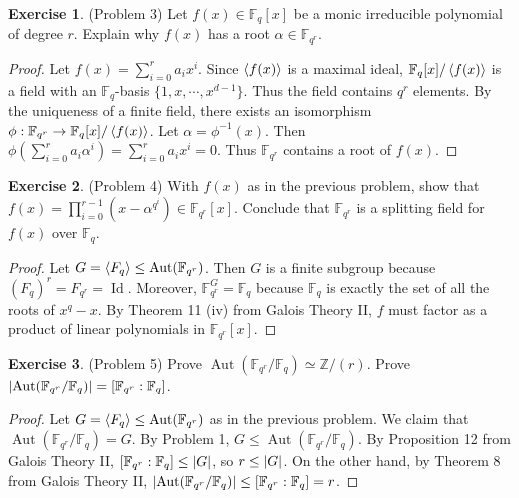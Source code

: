 \documentclass[12pt, psamsfonts]{amsart}
\theoremstyle{definition}
\newtheorem*{exer}{Exercise}
\theoremstyle{remark}
\DeclareMathOperator{\Id}{Id}
\DeclareMathOperator{\Aut}{Aut}
\numberwithin{equation}{section}
\begin{document}
\begin{exer}{(Problem 3)}
  Let $f(x) \in \mathbb{F}_q[x]$ be a monic irreducible polynomial of degree $r$.
  Explain why $f(x)$ has a root $\alpha \in \mathbb{F}_{q^r}$.
\end{exer}

\begin{proof}
  Let $f(x) = \sum_{i=0}^{r} a_ix^i$.
  Since $\ev{f(x)}$ is a maximal ideal, $\mathbb{F}_q[x]/\ev{f(x)}$ is a field with an $\mathbb{F}_q$-basis $\{ 1, x, \cdots, x^{d - 1} \}$.
  Thus the field contains $q^r$ elements.
  By the uniqueness of a finite field, there exists an isomorphism $\phi: \mathbb{F}_{q^r} \rightarrow \mathbb{F}_q[x]/\ev{f(x)}$.
  Let $\alpha = \phi^{-1}(x)$.
  Then $\phi(\sum_{i=0}^{r} a_i\alpha^i) = \sum_{i=0}^{r}a_ix^i = 0$.
  Thus $\mathbb{F}_{q^r}$ contains a root of $f(x)$.
\end{proof}

\begin{exer}{(Problem 4)}
  With $f(x)$ as in the previous problem, show that $f(x) = \prod_{i=0}^{r-1} (x - \alpha^{q^i}) \in \mathbb{F}_{q^r}[x]$.
  Conclude that $\mathbb{F}_{q^r}$ is a splitting field for $f(x)$ over $\mathbb{F}_q$.
\end{exer}

\begin{proof}
  Let $G = \ev{ F_q } \leq \Aut(\mathbb{F}_{q^r})$.
  Then $G$ is a finite subgroup because $(F_q)^r = F_{q^r} = \Id$.
  Moreover, $\mathbb{F}_{q^r}^G = \mathbb{F}_q$ because $\mathbb{F}_q$ is exactly the set of all the roots of $x^q - x$.
  By Theorem 11 (iv) from Galois Theory II, $f$ must factor as a product of linear polynomials in $\mathbb{F}_{q^r}[x]$.
\end{proof}

\begin{exer}{(Problem 5)}
  Prove $\Aut(\mathbb{F}_{q^r}/\mathbb{F}_q) \simeq \mathbb{Z}/(r)$.
  Prove $\abs{\Aut(\mathbb{F}_{q^r}/\mathbb{F}_q)} = [\mathbb{F}_{q^r}:\mathbb{F}_q]$.
\end{exer}

\begin{proof}
  Let $G = \ev{ F_q } \leq \Aut(\mathbb{F}_{q^r})$ as in the previous problem.
  We claim that $\Aut(\mathbb{F}_{q^r}/\mathbb{F}_q) = G$.
  By Problem 1, $G \leq \Aut(\mathbb{F}_{q^r}/\mathbb{F}_q)$.
  By Proposition 12 from Galois Theory II, $[\mathbb{F}_{q^r}:\mathbb{F}_q] \leq \abs{G}$, so $r \leq \abs{G}$.
  On the other hand, by Theorem 8 from Galois Theory II, $\abs{\Aut(\mathbb{F}_{q^r}/\mathbb{F}_q)} \leq [\mathbb{F}_{q^r}:\mathbb{F}_q] = r$.
\end{proof}
\end{document}
